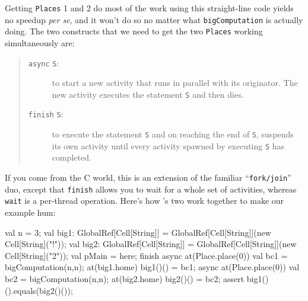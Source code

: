 Getting  {\tt Places} 1 and 2 do most of the work using this straight-line
code yields no
speedup {\em per se}, and it won't do so no
matter what {\tt bigComputation} is actually doing.  The two
constructs that we need to get the two {\tt Places} working simultaneously are:
\begin{quote}
\begin{description}
\item[ {\tt async} {\tt S}:] to start a new
activity that runs in parallel with its originator.  The new activity executes the
statement {\tt S} and then dies.
\item[{\tt finish} {\tt S}:] to execute the statement {\tt S} and on reaching the
end of {\tt S}, suspends its own activity until every activity spawned by
executing {\tt S} has completed.  
\end{description}
\end{quote}
If you come from the C world, this is an extension of the familiar ``{\tt fork/join}''
duo, except that {\tt finish} allows you to wait for a whole set of activities,
whereas {\tt wait} is a per-thread operation.
Here's how \Xten's two work together to make our example hum:
\begin{xtennum}[]
val n = 3;
val big1: GlobalRef[Cell[String]] = GlobalRef[Cell[String]](new Cell[String]("!"));
val big2: GlobalRef[Cell[String]] = GlobalRef[Cell[String]](new Cell[String]("2"));
val pMain = here;   
finish { 
   async at(Place.place(0)) { 
      val bc1 = bigComputation(n,n);
      at(big1.home) big1()() = bc1; 
   }
   async at(Place.place(0)) { 
      val bc2 = bigComputation(n,n);
      at(big2.home) big2()() = bc2; 
   }
} 
assert big1()().equals(big2()()); 
\end{xtennum}

